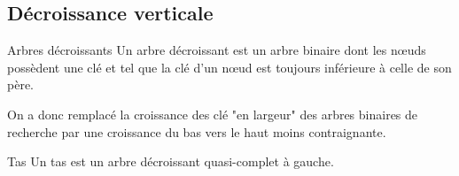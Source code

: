 \subsection{Décroissance verticale}
\begin{defin}{Arbres décroissants}{}
Un arbre décroissant est un arbre binaire dont les nœuds possèdent une clé et tel que la clé d'un nœud est toujours inférieure à celle de son père.
\end{defin}

On a donc remplacé la croissance des clé "en largeur" des arbres binaires de recherche par une croissance du bas vers le haut moins contraignante.
\begin{figure*}[ht]
\centering
{}
\caption{Un arbre décroissant}
\end{figure*}
\begin{defin}{Tas}{}
	Un tas est un arbre décroissant quasi-complet à gauche.
\end{defin}
\begin{figure*}[ht]
\centering
{}
\caption{Le tas $t_0$}
\end{figure*}
\newpage
